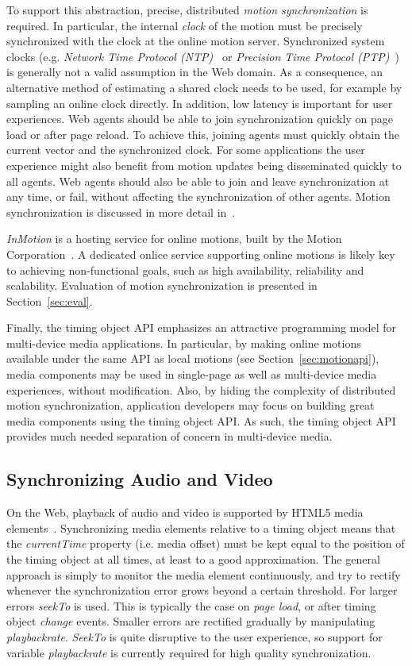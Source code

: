 \documentclass[graybox]{svmult}
\begin{document}
To support this abstraction, precise, distributed \emph{motion
synchronization} is required. In particular, the internal \emph{clock} of the
motion must be precisely synchronized with the clock at the online motion
server. Synchronized system clocks (e.g. \emph{Network Time Protocol (NTP)}~\cite{ntp} or \emph{Precision Time Protocol (PTP)}~\cite{ptp}) is
generally not a valid assumption in the Web domain.  As a consequence, an
alternative method of estimating a shared clock needs to be used, for example
by sampling an online clock directly. In addition, low latency is important
for user experiences. Web agents should be able to join synchronization
quickly on page load or after page reload. To achieve this, joining agents
must quickly obtain the current vector and the synchronized clock. For some
applications the user experience might also benefit from motion updates being
disseminated quickly to all agents. Web agents should also be able to join and
leave synchronization at any time, or fail, without affecting the
synchronization of other agents. Motion synchronization is discussed in more
detail in~\cite{msv}.

\emph{InMotion} is a hosting service for online motions, built by the Motion Corporation~\cite{mcorp}. A dedicated onlice service supporting
online motions is likely key to achieving non-functional goals, such as
high availability, reliability and scalability. Evaluation of
motion synchronization is presented in Section~\ref{sec:eval}.

Finally, the timing object API emphasizes an attractive programming model for
multi-device media applications. In particular, by making online motions
available under the same API as local motions (see Section~\ref{sec:motionapi}),
media components may be used in single-page as well as multi-device media
experiences, without modification. Also, by hiding the complexity of
distributed motion synchronization, application developers may focus on
building great media components using the timing object API. As such, the
timing object API provides much needed separation of concern in multi-device
media.

\subsection{Synchronizing Audio and Video}
\label{sec:avsync}

On the Web, playback of audio and video is supported by HTML5 media
elements~\cite{html5media}. Synchronizing media elements relative to a timing
object means that the \emph{currentTime} property (i.e. media offset) must be
kept equal to the position of the timing object at all times, at least to a
good approximation. The general approach is simply to monitor the media
element continuously, and try to rectify whenever the synchronization error
grows beyond a certain threshold. For larger errors \emph{seekTo} is used. This is
typically the case on \emph{page load}, or after timing object \emph{change} events. Smaller
errors are rectified gradually by manipulating \emph{playbackrate}. \emph{SeekTo} is
quite disruptive to the user experience, so support for variable \emph{playbackrate}
is currently required for high quality synchronization.
\end{document}
